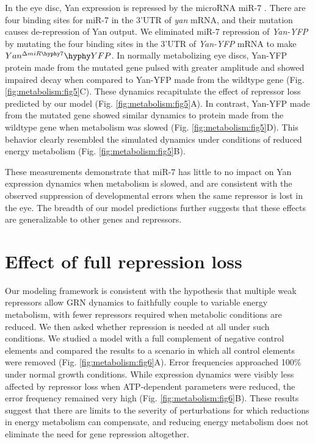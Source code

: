 In the eye disc, Yan expression is repressed by the microRNA miR-7 \cite{Li2005}. There are four binding sites for miR-7 in the 3'UTR of \textit{yan} mRNA, and their mutation causes de-repression of Yan output. We eliminated miR-7 repression of \textit{Yan-YFP} by mutating the four binding sites in the 3'UTR of \textit{Yan-YFP} mRNA to make $Yan^{\Delta miR\hyphy  7}\hyphy YFP$. In normally metabolizing eye discs, Yan-YFP protein made from the mutated gene pulsed with greater amplitude and showed impaired decay when compared to Yan-YFP made from the wildtype gene (Fig. \ref{fig:metabolism:fig5}C). These dynamics recapitulate the effect of repressor loss predicted by our model (Fig. \ref{fig:metabolism:fig5}A). In contrast, Yan-YFP made from the mutated gene showed similar dynamics to protein made from the wildtype gene when metabolism was slowed (Fig. \ref{fig:metabolism:fig5}D). This behavior clearly resembled the simulated dynamics under conditions of reduced energy metabolism (Fig. \ref{fig:metabolism:fig5}B).

These measurements demonstrate that miR-7 has little to no impact on Yan expression dynamics when metabolism is slowed, and are consistent with the observed suppression of developmental errors when the same repressor is lost in the eye. The breadth of our model predictions further suggests that these effects are generalizable to other genes and repressors.

\section{Effect of full repression loss}

Our modeling framework is consistent with the hypothesis that multiple weak repressors allow GRN dynamics to faithfully couple to variable energy metabolism, with fewer repressors required when metabolic conditions are reduced. We then asked whether repression is needed at all under such conditions. We studied a model with a full complement of negative control elements and compared the results to a scenario in which all control elements were removed (Fig. \ref{fig:metabolism:fig6}A). Error frequencies approached 100\% under normal growth conditions. While expression dynamics were visibly less affected by repressor loss when ATP-dependent parameters were reduced, the error frequency remained very high (Fig. \ref{fig:metabolism:fig6}B). These results suggest that there are limits to the severity of perturbations for which reductions in energy metabolism can compensate, and reducing energy metabolism does not eliminate the need for gene repression altogether.

